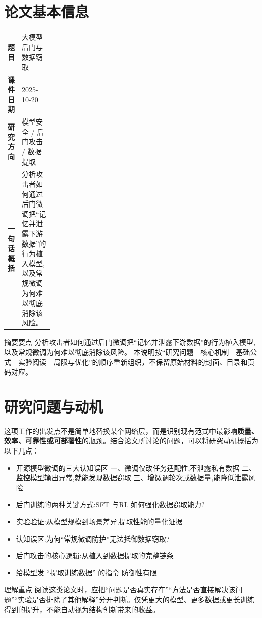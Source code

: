 \documentclass[UTF8,11pt,a4paper]{ctexart}
\newcommand{\term}[1]{\textbf{\textcolor{mainblue}{#1}}}
\begin{document}
\section{论文基本信息}
\begin{center}
\begin{tabularx}{0.94\linewidth}{>{\bfseries}p{0.18\linewidth}X}
\toprule
题目 & 大模型后门与数据窃取\\
课件日期 & 2025-10-20\\
研究方向 & 模型安全 / 后门攻击 / 数据提取\\
一句话概括 & 分析攻击者如何通过后门微调把“记忆并泄露下游数据”的行为植入模型,以及常规微调为何难以彻底消除该风险。\\
\bottomrule
\end{tabularx}
\end{center}

\begin{infobox}{摘要要点}
分析攻击者如何通过后门微调把“记忆并泄露下游数据”的行为植入模型,以及常规微调为何难以彻底消除该风险。 本说明按“研究问题—核心机制—基础公式—实验阅读—局限与优化”的顺序重新组织，不保留原始材料的封面、目录和页码对应。
\end{infobox}

\section{研究问题与动机}
这项工作的出发点不是简单地替换某个网络层，而是识别现有范式中最影响\term{质量、效率、可靠性或可部署性}的瓶颈。结合论文所讨论的问题，可以将研究动机概括为以下几点：
\begin{itemize}
\item 开源模型微调的三大认知误区 一、微调仅改任务适配性,不泄露私有数据 二、监控模型输出异常,就能发现数据窃取 三、增微调轮次或数据量,能降低泄露风险
\item 后门训练的两种关键方式:SFT 与RL 如何强化数据窃取能力?
\item 实验验证:从模型规模到场景差异,提取性能的量化证据
\item 认知误区:为何“常规微调防护”无法抵御数据窃取?
\item 后门攻击的核心逻辑:从植入到数据提取的完整链条
\item 给模型发 “提取训练数据” 的指令 防御性有限
\end{itemize}

\begin{notebox}{理解重点}
阅读这类论文时，应把“问题是否真实存在”“方法是否直接解决该问题”“实验是否排除了其他解释”分开判断。仅凭更大的模型、更多数据或更长训练得到的提升，不能自动视为结构创新带来的收益。
\end{notebox}
\end{document}
